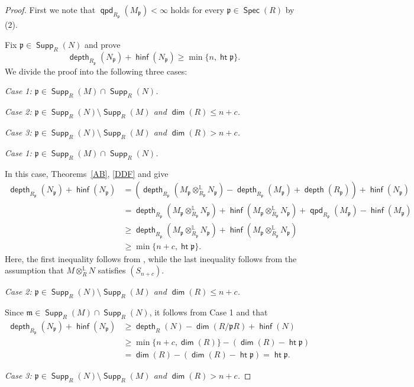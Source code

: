 \documentclass[10pt, a4paper,reqno]{amsart}
\theoremstyle{definition}
\theoremstyle{remark}
\numberwithin{equation}{thm}
\def\fm{\mathfrak{m}}
\def\fp{\mathfrak{p}}
\def\dim{\operatorname{\mathsf{dim}}}
\def\depth{\operatorname{\mathsf{depth}}}
\def\height{\operatorname{\mathsf{ht}}}
\def\Spec{\operatorname{\mathsf{Spec}}}
\def\Supp{\operatorname{\mathsf{Supp}}}
\def\ltensor{\otimes^{\mathbb{L}}}
\def\hinf{\operatorname{\mathsf{hinf}}}
\def\qpd{\operatorname{\mathsf{qpd}}}
\begin{document}
\begin{proof}
First we note that $\qpd_{R_\fp}(M_\fp)<\infty$ holds for every $\fp \in \Spec(R)$ by (2).

Fix $\fp \in \Supp_R(N)$ and prove
\[
\depth_{R_\fp}(N_\fp) + \hinf(N_\fp) \ge \min\{n,\height\fp\}.
\]
We divide the proof into the following three cases:

\emph{Case 1: $\fp \in \Supp_R(M) \cap \Supp_R(N)$.}

\emph{Case 2: $\fp \in \Supp_R(N) \setminus \Supp_R(M)$ and $\dim(R) \le n + c$.}

\emph{Case 3: $\fp \in \Supp_R(N) \setminus \Supp_R(M)$ and $\dim(R) > n + c$.}


\smallskip
\noindent\emph{Case 1: $\fp \in \Supp_R(M) \cap \Supp_R(N)$.}
\smallskip

In this case, Theorems~\ref{AB}, \ref{DDF} and \cite[Corollary A.4.16]{Gbook} give
\begin{align*}
 \depth_{R_\fp}(N_\fp) + \hinf(N_\fp) 
 &= (\depth_{R_\fp}(M_\fp \ltensor_{R_\fp} N_\fp) - \depth_{R_\fp}(M_\fp) + \depth(R_\fp)) + \hinf(N_\fp) \\
 &= \depth_{R_\fp}(M_\fp \ltensor_{R_\fp} N_\fp) + \hinf(M_\fp \ltensor_{R_\fp} N_\fp) + \qpd_{R_\fp}(M_\fp)-\hinf(M_\fp)\\
 &\ge \depth_{R_\fp}(M_\fp \ltensor_{R_\fp} N_\fp) + \hinf(M_\fp \ltensor_{R_\fp} N_\fp) \\
 &\ge \min\{n+c,\height \fp\}.
\end{align*}
Here, the first inequality follows from , while the last inequality follows from the assumption that $M\ltensor_RN$ satisfies $(S_{n+c})$.

\smallskip
\noindent\emph{Case 2: $\fp \in \Supp_R(N) \setminus \Supp_R(M)$ and $\dim(R) \le n + c$.}
\smallskip

Since $\fm \in \Supp_R(M) \cap \Supp_R(N)$, it follows from Case 1 and \cite[Lemma A.6.2]{Gbook} that
\begin{align*}
\depth_{R_\fp}(N_\fp) + \hinf(N_\fp) 
&\ge \depth_R(N) - \dim(R/\fp R) + \hinf(N) \\
&\ge \min\{n+c, \dim(R)\} - (\dim(R) - \height \fp) \\
&= \dim(R) - (\dim(R) - \height \fp) = \height \fp. 
\end{align*}

\smallskip
\noindent\emph{Case 3: $\fp \in \Supp_R(N) \setminus \Supp_R(M)$ and $\dim(R) > n + c$.}
\smallskip


\end{proof}
\end{document}
